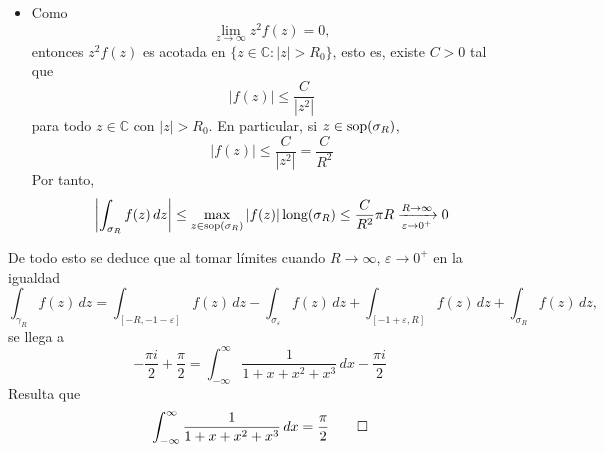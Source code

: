 \documentclass[11pt]{report}
\makeatletter
\renewenvironment{proof}[1][\proofname]{\par
  \pushQED{\qed}%
  \normalfont \topsep\z@skip %
  \trivlist
  \item[\hskip\labelsep
        \itshape
    #1\@addpunct{.}]\ignorespaces
}{%
  \popQED\endtrivlist\@endpefalse
}
\newcommand{\C}{\mathbb C}
\makeatother
\begin{document}
\begin{proof}
\begin{enumerate}
\begin{itemize}
  \item Como
  \[\lim_{z \to \infty} z^2f(z) = 0,\]
  entonces $z^2f(z)$ es acotada en $\{z \in \C \colon |z| > R_0\}$, esto es, existe $C>0$ tal que
  \[|f(z)| \leq \frac{C}{|z^2|}\]
  para todo $z \in \C$ con $|z|> R_0$. En particular, si $z \in \textup{sop}(\sigma_R)$,
  \[|f(z)| \leq \frac{C}{|z^2|} = \frac{C}{R^2}\]
  Por tanto,
  \[\left|\int_{\sigma_R} f(z) \, dz\right| \leq \max_{z \in \textup{sop}(\sigma_R)} |f(z)| \, \textup{long}(\sigma_R) \leq \frac{C}{R^2}\pi R \xrightarrow[\varepsilon \to 0^+]{R \to \infty} 0\]
\end{itemize}
De todo esto se deduce que al tomar límites cuando $R \to \infty$, $\varepsilon \to 0^+$ en la igualdad
\[\int_{\gamma_R}f(z) \, dz = \int_{[-R,-1-\varepsilon]}f(z) \, dz-\int_{\sigma_{\varepsilon}}f(z) \, dz+\int_{[-1+\varepsilon,R]}f(z) \, dz+\int_{\sigma_R}f(z) \, dz,\]
se llega a 
\[-\frac{\pi i}{2}+\frac{\pi }{2}= \int_{-\infty}^\infty \frac{1}{1+x+x^2+x^3} \, dx-\frac{\pi i}{2} \]
Resulta que
\[\int_{-\infty}^\infty \frac{1}{1+x+x^2+x^3} \, dx = \frac{\pi}{2} \qedhere\]
\end{enumerate}
\end{proof}
\end{document}
